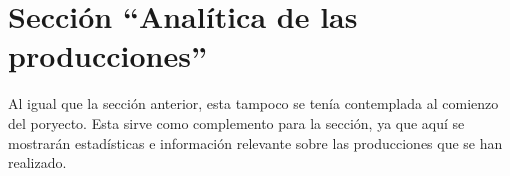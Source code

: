\section{Sección ``Analítica de las producciones''}
Al igual que la sección anterior, esta tampoco se tenía contemplada al comienzo del poryecto. Esta sirve como complemento para la sección, ya que aquí se mostrarán estadísticas e información relevante sobre las producciones que se han realizado.
    
    